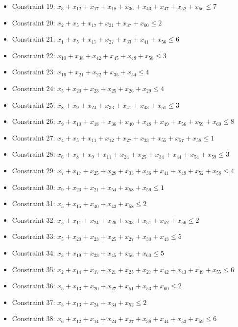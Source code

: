 \documentclass[11pt]{article}
\begin{document}
\begin{itemize}
\item Constraint 19: $x_{3} + x_{12} + x_{17} + x_{18} + x_{36} + x_{43} + x_{47} + x_{52} + x_{56} \le 7$
\item Constraint 20: $x_{2} + x_{5} + x_{17} + x_{31} + x_{37} + x_{60} \le 2$
\item Constraint 21: $x_{1} + x_{5} + x_{17} + x_{27} + x_{33} + x_{41} + x_{56} \le 6$
\item Constraint 22: $x_{10} + x_{38} + x_{42} + x_{45} + x_{48} + x_{58} \le 3$
\item Constraint 23: $x_{16} + x_{21} + x_{22} + x_{35} + x_{54} \le 4$
\item Constraint 24: $x_{5} + x_{20} + x_{23} + x_{25} + x_{26} + x_{29} \le 4$
\item Constraint 25: $x_{8} + x_{9} + x_{24} + x_{33} + x_{41} + x_{43} + x_{51} \le 3$
\item Constraint 26: $x_{9} + x_{10} + x_{18} + x_{36} + x_{40} + x_{48} + x_{49} + x_{56} + x_{59} + x_{60} \le 8$
\item Constraint 27: $x_{4} + x_{5} + x_{11} + x_{12} + x_{27} + x_{33} + x_{55} + x_{57} + x_{58} \le 1$
\item Constraint 28: $x_{6} + x_{8} + x_{9} + x_{11} + x_{24} + x_{25} + x_{34} + x_{44} + x_{54} + x_{59} \le 3$
\item Constraint 29: $x_{7} + x_{17} + x_{25} + x_{28} + x_{33} + x_{36} + x_{41} + x_{49} + x_{52} + x_{58} \le 4$
\item Constraint 30: $x_{9} + x_{20} + x_{21} + x_{54} + x_{58} + x_{59} \le 1$
\item Constraint 31: $x_{5} + x_{15} + x_{40} + x_{43} + x_{58} \le 2$
\item Constraint 32: $x_{5} + x_{11} + x_{24} + x_{26} + x_{33} + x_{51} + x_{52} + x_{56} \le 2$
\item Constraint 33: $x_{5} + x_{20} + x_{23} + x_{25} + x_{27} + x_{30} + x_{43} \le 5$
\item Constraint 34: $x_{3} + x_{19} + x_{23} + x_{45} + x_{56} + x_{60} \le 5$
\item Constraint 35: $x_{2} + x_{14} + x_{17} + x_{21} + x_{25} + x_{27} + x_{42} + x_{43} + x_{49} + x_{55} \le 6$
\item Constraint 36: $x_{5} + x_{13} + x_{20} + x_{27} + x_{51} + x_{53} + x_{60} \le 2$
\item Constraint 37: $x_{3} + x_{13} + x_{24} + x_{34} + x_{52} \le 2$
\item Constraint 38: $x_{6} + x_{12} + x_{14} + x_{24} + x_{27} + x_{38} + x_{44} + x_{53} + x_{59} \le 6$

\end{itemize}
\end{document}
